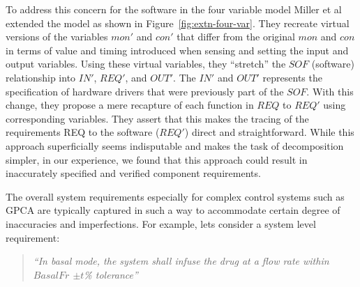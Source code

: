 To address this concern for the software in the four variable model Miller et al extended the model as shown in Figure~\ref{fig:extn-four-var}. They recreate virtual versions of the variables $mon'$ and $con'$ that differ from the original $mon$ and $con$ in terms of value and timing introduced when sensing and setting the input and output variables. Using these virtual variables, they ``stretch'' the $SOF$ (software) relationship into $IN'$, $REQ'$, and $OUT'$. The $IN'$ and $OUT'$ represents the specification of hardware drivers that were previously part of the $SOF$. With this change, they propose a mere recapture of each function in $REQ$ to $REQ'$ using corresponding variables. They assert that this makes the tracing of the requirements REQ to the software ($REQ'$) direct and straightforward. While this approach superficially seems indisputable and makes the task of decomposition simpler, in our experience, we found that this approach could result in inaccurately specified and verified component requirements.

The overall system requirements especially for complex control systems such as GPCA are typically captured in such a way to accommodate certain degree of inaccuracies and imperfections. For example, lets consider a system level requirement:

\begin{quotation}
\emph{``In basal mode, the system shall infuse the drug at a flow rate within $BasalFr$ $\pm t$\% tolerance''}
\end{quotation}

